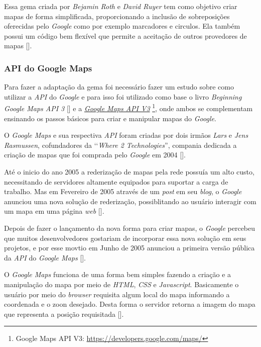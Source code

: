 Essa gema criada por \emph{Bejamin Roth} e \emph{David Ruyer} tem como objetivo criar mapas de forma 
simplificada, proporcionando a inclusão de sobreposições oferecidas pelo \emph{Google} como por exemplo 
marcadores e circulos. Ela também possui um código bem flexível que permite a aceitação de outros 
provedores de mapas [].

\subsubsection{API do Google Maps} 
\label{api_do_google_maps} 
 
Para fazer a adaptação da gema foi necessário fazer um estudo sobre como utilizar a \emph{API} do 
\emph{Google} e para isso foi utilizado como base o livro \emph{Beginning Google Maps API 3} 
[] e a 
\emph{\href{https://developers.google.com/maps/}{Google Maps API V3}} 
\footnote{Google Maps API V3: \url{https://developers.google.com/maps/}}, onde ambos se complementam 
ensinando os passos básicos para criar e manipular mapas do \emph{Google}. 

O \emph{Google Maps} e sua respectiva \emph{API} foram criadas por dois irmãos \emph{Lars} e 
\emph{Jens Rasmussen}, cofundadores da ‘‘\emph{Where 2 Technologies}'', compania dedicada a criação de mapas
que foi comprada pelo \emph{Google} em 2004 [].

Até o inicio do ano 2005 a rederização de mapas pela rede possuía um alto custo, necessitando de 
servidores altamente equipados para suportar a carga de trabalho. Mas em Fevereiro de 2005 através 
de um \emph{post} em seu \emph{blog}, o \emph{Google} anunciou uma nova solução de rederização, 
possiblitando ao usuário interagir com um mapa em uma página \emph{web}
[].

Depois de fazer o lançamento da nova forma para criar mapas, o \emph{Google} percebeu que 
muitos desenvolvedores gostariam de incorporar essa nova solução em seus projetos, e por esse 
movtio em Junho de 2005 anunciou a primeira versão pública da \emph{API} do \emph{Google Maps}
[].

O \emph{Google Maps} funciona de uma forma bem simples fazendo a criação e a manipulação do mapa
por meio de \emph{HTML}, \emph{CSS} e \emph{Javascript}. Basicamente o usuário por meio do \emph{browser}
requisita algum local do mapa informando a coordenada e o zoon desejado. Desta forma o servidor retorna a 
imagem do mapa que representa a posição requisitada []. 

